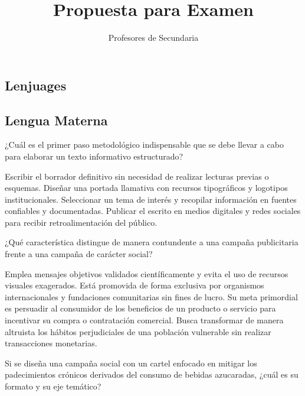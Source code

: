 \documentclass[12pt]{evaluasep}
\title{Propuesta para Examen}
\author{Profesores de Secundaria}
\begin{document}
	\tableofcontents
\newpage
\begin{questions}
		\section{Lenjuages}
                \subsection{Lengua Materna}

                \question ¿Cuál es el primer paso metodológico indispensable que se debe llevar a cabo para elaborar un texto informativo estructurado?
    
                \begin{choices}
        \choice Escribir el borrador definitivo sin necesidad de realizar lecturas previas o esquemas.
        \choice Diseñar una portada llamativa con recursos tipográficos y logotipos institucionales.
        \CorrectChoice Seleccionar un tema de interés y recopilar información en fuentes confiables y documentadas.
        \choice Publicar el escrito en medios digitales y redes sociales para recibir retroalimentación del público.
    
    \end{choices}
    

    \question ¿Qué característica distingue de manera contundente a una campaña publicitaria frente a una campaña de carácter social?
    
    \begin{choices}
        \choice Emplea mensajes objetivos validados científicamente y evita el uso de recursos visuales exagerados.
        \choice Está promovida de forma exclusiva por organismos internacionales y fundaciones comunitarias sin fines de lucro.
        \CorrectChoice Su meta primordial es persuadir al consumidor de los beneficios de un producto o servicio para incentivar su compra o contratación comercial.
        \choice Busca transformar de manera altruista los hábitos perjudiciales de una población vulnerable sin realizar transacciones monetarias.
    
    \end{choices}
    

    \question Si se diseña una campaña social con un cartel enfocado en mitigar los padecimientos crónicos derivados del consumo de bebidas azucaradas, ¿cuál es su formato y su eje temático?
    

\end{questions}
\end{document}
